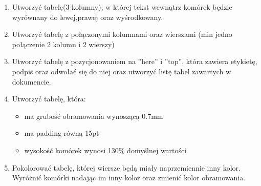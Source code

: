 \documentclass[table]{beamer}
\begin{document}
\begin{frame}
 \begin{enumerate}
 	\item Utworzyć tabelę(3 kolumny), w której tekst wewnątrz komórek będzie wyrównany do lewej,prawej oraz wyśrodkowany. 
 	\item Utworzyć tabelę z połączonymi kolumnami oraz wierszami (min jedno połączenie 2 kolumn i 2 wierszy)
 	\item Utworzyć tabelę z pozycjonowaniem na ''here'' i ''top'', która zawiera etykietę, podpis oraz odwołać się do niej oraz utworzyć listę tabel zawartych w dokumencie.
 	\item Utworzyć tabelę, która:
 		\begin{itemize}
 			\item ma grubość obramowania wynoszącą 0.7mm
 			\item ma padding równą 15pt
 			\item wysokość komórek wynosi 130\% domyślnej wartości
 		\end{itemize}
 	\item Pokolorować tabelę, której wiersze będą miały naprzemiennie inny kolor.
 	Wyróżnić komórki nadając im inny kolor oraz zmienić kolor obramowania.
 \end{enumerate}
\end{frame}
\end{document}
